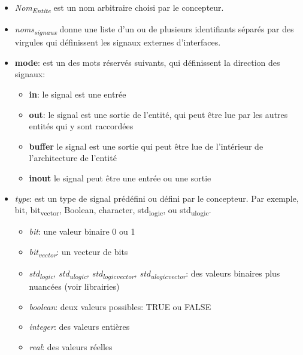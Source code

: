 \documentclass[11pt]{article}
\begin{document}
\begin{itemize}
\item \emph{Nom\textsubscript{Entite}} est un nom arbitraire choisi par le concepteur.

\item \emph{noms\textsubscript{signaux}} donne une liste d'un ou de plusieurs identifiants
séparés par des virgules qui définissent les signaux externes
d'interfaces.

\item \textbf{mode}: est un des mots réservés suivants, qui définissent la
direction des signaux:

\begin{itemize}
\item \textbf{in}: le signal est une entrée

\item \textbf{out}: le signal est une sortie de l'entité, qui peut être lue
par les autres entités qui y sont raccordées

\item \textbf{buffer} le signal est une sortie qui peut être lue de
l'intérieur de l'architecture de l'entité

\item \textbf{inout} le signal peut être une entrée ou une sortie
\end{itemize}

\item \emph{type}: est un type de signal prédéfini ou défini par le
concepteur. Par exemple, bit, bit\textsubscript{vector}, Boolean, character,
std\textsubscript{logic}, ou std\textsubscript{ulogic}.

\begin{itemize}
\item \emph{bit}: une valeur binaire  0 ou 1

\item \emph{bit\textsubscript{vector}}: un vecteur de bits

\item \emph{std\textsubscript{logic}, std\textsubscript{ulogic}, std\textsubscript{logic}\textsubscript{vector}, std\textsubscript{ulogic}\textsubscript{vector}}: des
valeurs binaires plus nuancées (voir librairies)

\item \emph{boolean}: deux valeurs possibles: TRUE ou FALSE

\item \emph{integer}: des valeurs entières

\item \emph{real}: des valeurs réelles


\end{itemize}
\end{itemize}
\end{document}
